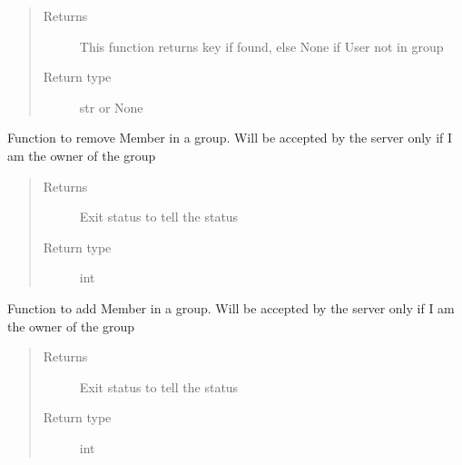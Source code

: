 \documentclass[letterpaper,10pt,english]{sphinxmanual}
\begin{document}
\begin{fulllineitems}
\begin{fulllineitems}
\begin{quote}
\begin{description}
\item[{Returns}] \leavevmode
This function returns key if found, else None if User not in group

\item[{Return type}] \leavevmode
str or None

\end{description}\end{quote}

\end{fulllineitems}


\begin{fulllineitems}
\label{\detokenize{Message:Message.Message._remove_member_from_group}}
Function to remove Member in a group. Will be accepted by the server only if I am the owner of the group
\begin{quote}\begin{description}
\item[{Returns}] \leavevmode
Exit status to tell the status

\item[{Return type}] \leavevmode
int

\end{description}\end{quote}

\end{fulllineitems}


\begin{fulllineitems}
\label{\detokenize{Message:Message.Message._add_member_in_group}}
Function to add Member in a group. Will be accepted by the server only if I am the owner of the group
\begin{quote}\begin{description}
\item[{Returns}] \leavevmode
Exit status to tell the status

\item[{Return type}] \leavevmode
int

\end{description}\end{quote}


\end{fulllineitems}
\end{fulllineitems}
\end{document}
